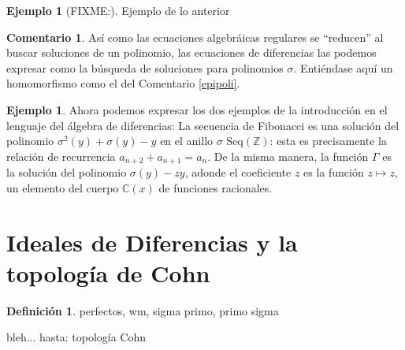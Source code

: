 \documentclass[12pt,a4paper,BCOR15mm,twoside,DIV12]{article}
\def\Z{\mathbb{Z}}
\def\C{\mathbb{C}}
\theoremstyle{definition}
\newtheorem{ex}[Satz]{Ejemplo}
\newtheorem{rem}[Satz]{Comentario}
\newtheorem{defn}[Satz]{Definición}
\begin{document}
\begin{ex}
[FIXME:] Ejemplo de lo anterior
\end{ex}

\begin{rem}
Así como las ecuaciones algebráicas regulares se ``reducen'' al buscar soluciones de un polinomio, 
las ecuaciones de diferencias las podemos expresar como la búsqueda de soluciones para  polinomios $\sigma$. Entiéndase aquí un homomorfismo como el del Comentario \ref{epipoli}.
\end{rem}

\begin{ex}
Ahora podemos expresar los dos ejemplos de la introducción en el lenguaje del álgebra de diferencias:
La secuencia de Fibonacci es una solución del polinomio $\sigma^2(y) + \sigma(y) - y$ en el anillo $\sigma$ $\text{Seq}(\Z)$: esta es precisamente la relación de recurrencia $a_{n+2} + a_{n+1} = a_n$.
De la misma manera, la función $\Gamma$ es la solución del polinomio $\sigma(y) - zy$, adonde el coeficiente $z$ es la función $z \mapsto z$, un elemento del cuerpo $\C(x)$ de funciones racionales.
\end{ex}

\section{Ideales de Diferencias y la topología de Cohn}

\begin{defn} perfectos, wm, sigma primo, primo sigma
\end{defn}

bleh... hasta: topología Cohn
\end{document}
